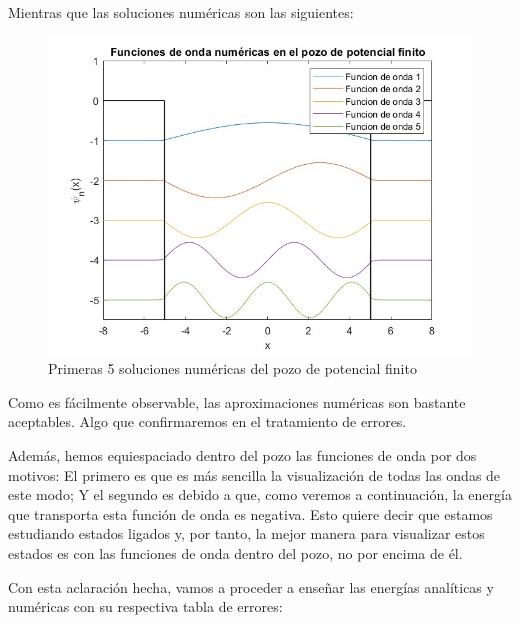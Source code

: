 \documentclass[12pt]{article}
\begin{document}
Mientras que las soluciones numéricas son las siguientes:

\begin{figure}[H]
    \centering
    \includegraphics[width=1.0\textwidth]{numericas.jpg}
    \caption{Primeras 5 soluciones numéricas del pozo de potencial finito}
\end{figure} 
Como es fácilmente observable, las aproximaciones numéricas
son bastante aceptables. Algo que confirmaremos en el tratamiento
de errores. \\
\par 
Además, hemos equiespaciado dentro del pozo las funciones de onda
por dos motivos: El primero es que es más sencilla la visualización
de todas las ondas de este modo; Y el segundo es debido a que,
como veremos a continuación, la energía que transporta esta 
función de onda es negativa. Esto quiere decir que estamos 
estudiando estados ligados y, por tanto, la mejor manera para 
visualizar estos estados es con las funciones de onda dentro del
pozo, no por encima de él. \\
\par
Con esta aclaración hecha, vamos a proceder a enseñar las 
energías analíticas y numéricas con su respectiva tabla de 
errores:
\end{document}
